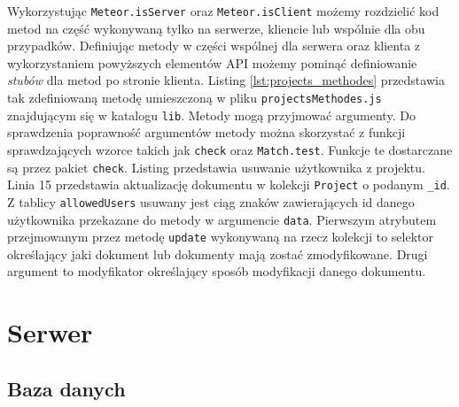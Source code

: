 Wykorzystując \verb|Meteor.isServer| oraz \verb|Meteor.isClient| możemy rozdzielić kod metod na część wykonywaną tylko na serwerze, kliencie lub wspólnie dla obu przypadków. Definiując metody w części wspólnej dla serwera oraz klienta z wykorzystaniem powyższych elementów API możemy pominąć definiowanie \textit{stubów} dla metod po stronie klienta. Listing \ref{lst:projects_methodes} przedstawia  tak zdefiniowaną metodę umieszczoną w  pliku \verb|projectsMethodes.js| znajdującym się w katalogu \verb|lib|. Metody mogą przyjmować argumenty. Do sprawdzenia poprawność argumentów metody można skorzystać z funkcji sprawdzających wzorce takich jak \verb|check| oraz \verb|Match.test|. Funkcje te dostarczane są przez pakiet \verb|check|. Listing przedstawia usuwanie użytkownika z projektu. Linia 15 przedstawia aktualizację dokumentu w kolekcji \verb|Project| o podanym \verb|_id|. Z tablicy \verb|allowedUsers| usuwany jest ciąg znaków zawierających id danego użytkownika przekazane do metody w argumencie \verb|data|. Pierwszym atrybutem przejmowanym przez metodę \verb|update| wykonywaną na rzecz kolekcji to selektor określający jaki dokument lub dokumenty mają zostać zmodyfikowane. Drugi argument to modyfikator określający sposób modyfikacji danego dokumentu. 

\section{Serwer}
  \subsection{Baza danych}

